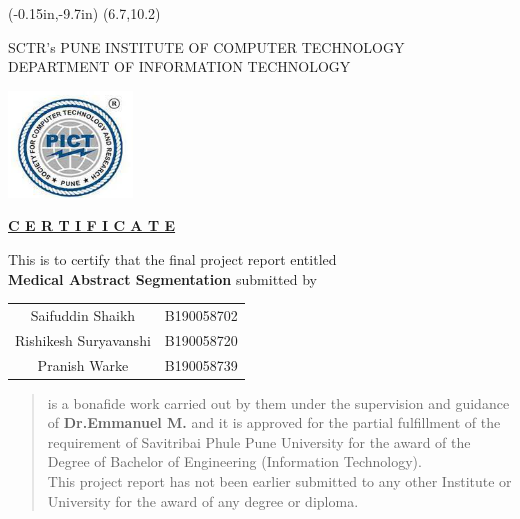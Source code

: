 \documentclass[12pt,a4paper]{report}     %
\begin{document}
	\thisfancyput(-0.15in,-9.7in){%
\setlength{\unitlength}{1in}\framebox(6.7,10.2)}
\begin{center}

{ SCTR's
   PUNE INSTITUTE OF COMPUTER TECHNOLOGY \\
   \small{DEPARTMENT OF INFORMATION TECHNOLOGY} \\

}
\vspace{0.10in}

\vspace{0.1in}
\includegraphics[scale=1.5]{pict_logo.png}
\end{center}
\vspace{0.075in}
\begin{center}
\textbf{\underline{C E R T I F I C A T E}}
\vspace{0.08in}
\end{center}
		\noindent
  				\setlength{\baselineskip}{1.1\baselineskip}
	\begin{center}
This is to certify that the final project report entitled  \\
		\textbf{Medical Abstract Segmentation} 
\singlespace
submitted by\\
\begin{center}
\begin{tabular}{ c c }
    Saifuddin Shaikh & B190058702 \\
    Rishikesh Suryavanshi & B190058720 \\
    Pranish Warke & B190058739 \\
\end{tabular}
 
	\end{center}
	\end{center}

\onehalfspace
\begin{quote}
is a bonafide work carried out by them under the supervision and guidance of \textbf{Dr.Emmanuel M.} and
it is approved for the partial fulfillment of the requirement of Savitribai Phule Pune University for the award of the Degree of Bachelor of Engineering (Information Technology).\\

This project report has not been earlier submitted to any other Institute or University for the award of any degree or diploma.\\
\end{quote}
		\noindent 
		
\end{document}
